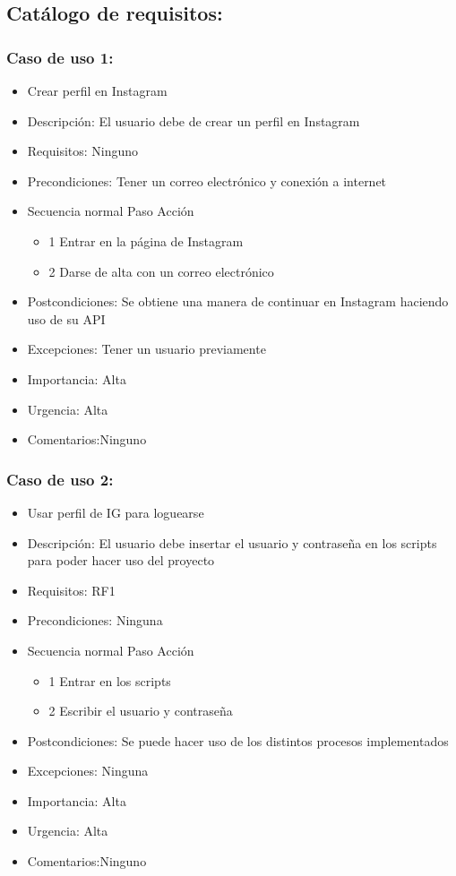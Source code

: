 \subsection{Catálogo de requisitos:}

\subsubsection{Caso de uso 1:}
\begin{itemize}
\item Crear perfil en Instagram
\item Descripción: El usuario debe de crear un perfil en Instagram
\item Requisitos: Ninguno
\item Precondiciones: Tener un correo electrónico y conexión a internet
\item Secuencia normal 	Paso	 Acción
\begin{itemize}
    \item 1	Entrar en la página de Instagram 
    \item 2	Darse de alta con un correo electrónico
\end{itemize}
\item Postcondiciones: Se obtiene una manera de continuar en Instagram haciendo uso de su API
\item Excepciones: Tener un usuario previamente
\item Importancia: Alta
\item Urgencia: Alta
\item Comentarios:Ninguno
\end{itemize}

\subsubsection{Caso de uso 2:}
\begin{itemize}
\item Usar perfil de IG para loguearse
\item Descripción: El usuario debe insertar el usuario y contraseña en los scripts para poder hacer uso del proyecto
\item Requisitos: RF1
\item Precondiciones: Ninguna
\item Secuencia normal 	Paso	 Acción
\begin{itemize}
    \item 1	Entrar en los scripts 
    \item 2	Escribir el usuario y contraseña
\end{itemize}
\item Postcondiciones: Se puede hacer uso de los distintos procesos implementados
\item Excepciones: Ninguna
\item Importancia: Alta
\item Urgencia: Alta
\item Comentarios:Ninguno
\end{itemize}

